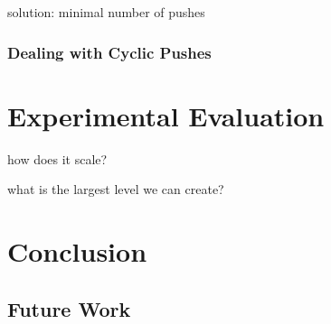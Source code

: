\documentclass[runningheads]{llncs}
\begin{document}
solution: minimal number of pushes

\subsubsection{Dealing with Cyclic Pushes}

\section{Experimental Evaluation}
how does it scale?

what is the largest level we can create?

\section{Conclusion}
\subsection{Future Work}

%
%
%

% 
%
\end{document}
